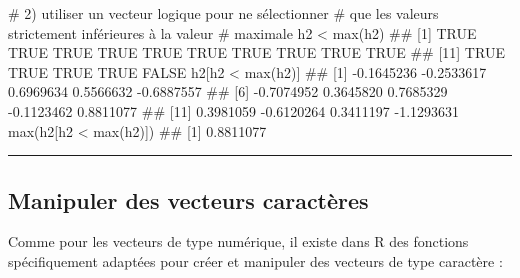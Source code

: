 \documentclass[12pt,twosided, notitlepage]{book}
\newenvironment{Shaded}{}{}
\newcommand{\KeywordTok}[1]{\textcolor[rgb]{0.00,0.00,1.00}{#1}}
\newcommand{\StringTok}[1]{\textcolor[rgb]{0.00,0.50,0.50}{#1}}
\newcommand{\CommentTok}[1]{\textcolor[rgb]{0.00,0.50,0.00}{#1}}
\newcommand{\OperatorTok}[1]{#1}
\newcommand{\NormalTok}[1]{#1}
\renewenvironment{Shaded}{\begin{snugshade}}{\end{snugshade}}
\begin{document}
\begin{enumerate}
\begin{Shaded}
\begin{Highlighting}[]
\CommentTok{# 2) utiliser un vecteur logique pour ne sélectionner }
\CommentTok{# que les valeurs strictement inférieures à la valeur }
\CommentTok{# maximale }
\NormalTok{h2 }\OperatorTok{<}\StringTok{ }\KeywordTok{max}\NormalTok{(h2)}
\NormalTok{  ##  [1]  TRUE  TRUE  TRUE  TRUE  TRUE  TRUE  TRUE  TRUE  TRUE  TRUE}
\NormalTok{  ## [11]  TRUE  TRUE  TRUE  TRUE FALSE}
\NormalTok{h2[h2 }\OperatorTok{<}\StringTok{ }\KeywordTok{max}\NormalTok{(h2)]}
\NormalTok{  ##  [1] -0.1645236 -0.2533617  0.6969634  0.5566632 -0.6887557}
\NormalTok{  ##  [6] -0.7074952  0.3645820  0.7685329 -0.1123462  0.8811077}
\NormalTok{  ## [11]  0.3981059 -0.6120264  0.3411197 -1.1293631}
\KeywordTok{max}\NormalTok{(h2[h2 }\OperatorTok{<}\StringTok{ }\KeywordTok{max}\NormalTok{(h2)])}
\NormalTok{  ## [1] 0.8811077}
\end{Highlighting}
\end{Shaded}

  \begin{center} \rule{0.5\linewidth}{\linethickness}\end{center}

  \bigskip  \fi 
\end{enumerate}

\subsection{Manipuler des vecteurs
caractères}\label{manipuler-des-vecteurs-caracteres}

Comme pour les vecteurs de type numérique, il existe dans R des
fonctions spécifiquement adaptées pour créer et manipuler des vecteurs
de type caractère :
\end{document}
